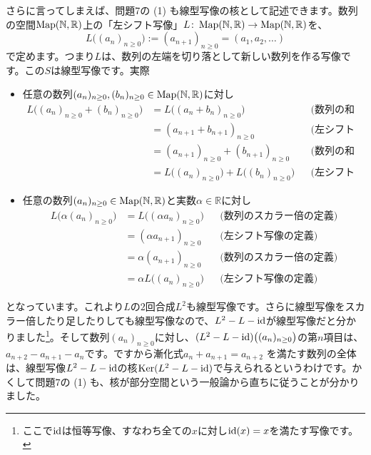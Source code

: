 さらに言ってしまえば、問題7の (1) も線型写像の核として記述できます。数列の空間$\operatorname{Map}(\mathbb{N}, \mathbb{R})$上の「左シフト写像」$L\colon \operatorname{Map}(\mathbb{N}, \mathbb{R})\rightarrow \operatorname{Map}(\mathbb{N}, \mathbb{R})$を、
\[
L\bigl((a_n)_{n\geq 0}\bigr) := (a_{n+1})_{n \geq 0} = (a_1, a_2, \ldots)
\]
で定めます。つまり$L$は、数列の左端を切り落として新しい数列を作る写像です。この$S$は線型写像です。実際
\begin{itemize}
\item 任意の数列$(a_n)_{n \geq 0}, (b_n)_{n \geq 0}\in\operatorname{Map}(\mathbb{N}, \mathbb{R})$に対し
\begin{align*}
L\bigl((a_n)_{n \geq 0} + (b_n)_{n \geq 0}\bigr)
&= L\bigl((a_n + b_n)_{n \geq 0}\bigr) & & \text{(数列の和の定義)} \\
&= (a_{n + 1} + b_{n + 1})_{n \geq 0} & & \text{(左シフト写像の定義)} \\
&= (a_{n + 1})_{n \geq 0} + (b_{n + 1})_{n \geq 0} & & \text{(数列の和の定義)} \\
&= L\bigl((a_n)_{n \geq 0}\bigr) + L\bigl((b_n)_{n \geq 0}\bigr) & & \text{(左シフト写像の定義)} 
\end{align*}
\item 任意の数列$(a_n)_{n \geq 0}\in\operatorname{Map}(\mathbb{N}, \mathbb{R})$と実数$\alpha\in\mathbb{R}$に対し
\begin{align*}
L\bigl(\alpha (a_n)_{n \geq 0}\bigr) 
&= L\bigl((\alpha a_n)_{n \geq 0}\bigr) & & \text{(数列のスカラー倍の定義)} \\
&= (\alpha a_{n+1})_{n \geq 0} & & \text{(左シフト写像の定義)} \\
&= \alpha (a_{n+1})_{n \geq 0} & & \text{(数列のスカラー倍の定義)} \\
&= \alpha L\bigl((a_n)_{n \geq 0}\bigr) & & \text{(左シフト写像の定義)}
\end{align*}
\end{itemize}
となっています。これより$L$の$2$回合成$L^2$も線型写像です。さらに線型写像をスカラー倍したり足したりしても線型写像なので、$L^2 - L - \operatorname{id}$が線型写像だと分かりました\footnote{ここで$\operatorname{id}$は恒等写像、すなわち全ての$x$に対し$\operatorname{id}(x) = x$を満たす写像です。}。そして数列$(a_n)_{n\geq 0}$に対し、$(L^2 - L -\operatorname{id})\bigl((a_n)_{n\geq 0}\bigr)$の第$n$項目は、$a_{n+2} - a_{n+1} - a_n$です。ですから漸化式$a_n + a_{n+1} = a_{n+2}$ を満たす数列の全体は、線型写像$L^2 - L - \operatorname{id}$の核$\operatorname{Ker} (L^2 - L - \operatorname{id})$で与えられるというわけです。かくして問題$7$の (1) も、核が部分空間という一般論から直ちに従うことが分かりました。

